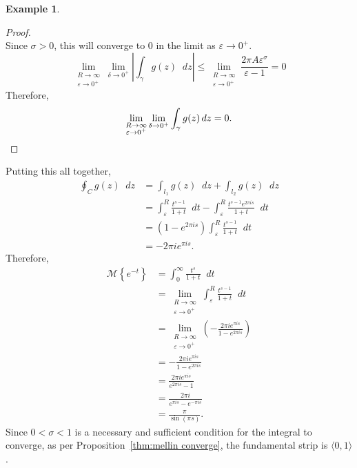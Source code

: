 \documentclass[a4paper]{article}
\newcommand*\diff{\mathop{}\!d} %
\theoremstyle{definition}
\newtheorem{example}[theorem]{Example}
\begin{document}
\begin{example}
\begin{proof}
\begin{equation*}
        \end{equation*}
        Since $\sigma > 0$, this will converge to 0 in the limit as $\varepsilon \to 0^+$.
        \begin{equation*}
            \lim_{\substack{R \to \infty \\ \varepsilon \to 0^+}} \lim_{\delta \to 0^+} \left\lvert \int_\gamma g(z) \diff z \right\rvert \leq \lim_{\substack{R \to \infty \\ \varepsilon \to 0^+}} \frac{2 \pi A \varepsilon^\sigma}{\varepsilon-1} = 0
        \end{equation*}
        Therefore,
        \begin{equation*}
            \lim_{\substack{R \to \infty \\ \varepsilon \to 0^+}} \lim_{\delta \to 0^+} \int_\gamma g(z) \diff z = 0. \qedhere
        \end{equation*}
    \end{proof}
    Putting this all together,
    \begin{align*}
        \oint_C g(z) \diff z & = \int_{l_1} g(z) \diff z + \int_{l_2} g(z) \diff z                                                             \\
                             & = \int_\varepsilon^R \frac{t^{s-1}}{1+t} \diff t - \int_\varepsilon^R \frac{t^{s-1} e^{2 \pi i s}}{1+t} \diff t \\
                             & = \left(1-e^{2 \pi i s}\right) \int_\varepsilon^R \frac{t^{s-1}}{1+t} \diff t                                   \\
                             & = - 2 \pi i e^{\pi i s}.
    \end{align*}
    Therefore,
    \begin{align*}
        \mathcal{M}\left\{e^{-t}\right\} & = \int_0^\infty \frac{t^s}{1+t} \diff t         \\
                                         & = \lim_{\substack{ R \to \infty                 \\ \varepsilon \to 0^+}} \int_\varepsilon^R \frac{t^{s-1}}{1+t} \diff t \\
                                         & = \lim_{\substack{ R \to \infty                 \\ \varepsilon \to 0^+}} \left(- \frac{2 \pi i e^{\pi i s}}{1-e^{2 \pi i s}} \right) \\
                                         & = - \frac{2 \pi i e^{\pi i s}}{1-e^{2 \pi i s}} \\
                                         & = \frac{2 \pi i e^{\pi i s}}{e^{2 \pi i s} - 1} \\
                                         & = \frac{2\pi i}{e^{\pi i s} - e^{- \pi i s}}    \\
                                         & = \frac{\pi}{\sin(\pi s)}.
    \end{align*}
    Since $0 < \sigma < 1$ is a necessary and sufficient condition for the integral to converge, as per Proposition~\ref{thm:mellin converge}, the fundamental strip is $\langle 0, 1 \rangle$.
\end{example}
\end{document}
